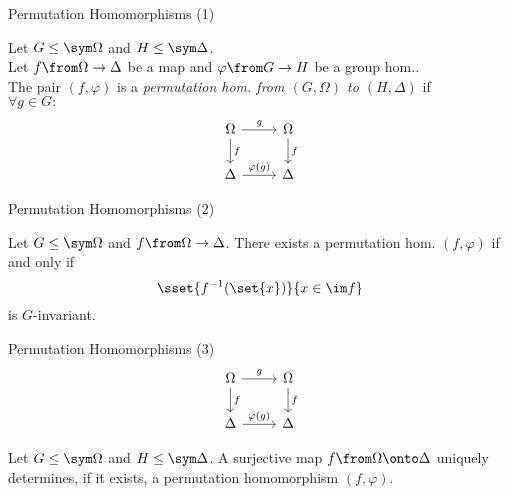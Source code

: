 \begin{frame}{Permutation Homomorphisms (1)}
    \begin{defn}
        Let $G \leq \sym \Omega$ and $H \leq \sym \Delta$.
        \\
        \pause
        Let
        $f \from \Omega \to \Delta$
        be a map
        and
        $\varphi \from G \to H$
        be a group hom..
        \\
        \pause
        The pair $(f, \varphi)$ is a
        \emph{%
        permutation hom. from $(G, \Omega)$ to $(H, \Delta)$
        }
        if
        \\
        \pause
        $\forall g \in G :$
        \[
        \begin{tikzcd}[ampersand replacement=\&]
            \Omega
                \ar[r, "g"]
                \ar[d, "f"]
            \&
            \Omega
                \ar[d, "f"]
            \\
            \Delta
                \ar[r, "\varphi(g)"]
            \&
            \Delta
        \end{tikzcd}
        \]
    \end{defn}
\end{frame}

\begin{frame}{Permutation Homomorphisms (2)}
    \begin{lemma}
        Let $G \leq \sym \Omega$ and $f \from \Omega \to \Delta$.
        There exists a permutation hom.
        $(f, \varphi)$
        if and only if
        \pause
        \[
            \sset{ f ^ {-1}(\set{x}) }{ x \in \im f }
        \]
        is $G$-invariant.
    \end{lemma}
\end{frame}


\begin{frame}{Permutation Homomorphisms (3)}
    \[
    \begin{tikzcd}[ampersand replacement=\&]
        \Omega
            \ar[r, "g"]
            \ar[d, "f"]
        \&
        \Omega
            \ar[d, "f"]
        \\
        \Delta
            \ar[r, "\varphi(g)"]
        \&
        \Delta
    \end{tikzcd}
    \]

    \begin{rem}
        Let $G \leq \sym \Omega$ and $H \leq \sym \Delta$.
        A surjective map $f \from \Omega \onto \Delta$
        \pause
        uniquely determines,
        if it exists,
        a permutation homomorphism
        $(f, \varphi)$.
    \end{rem}
\end{frame}

